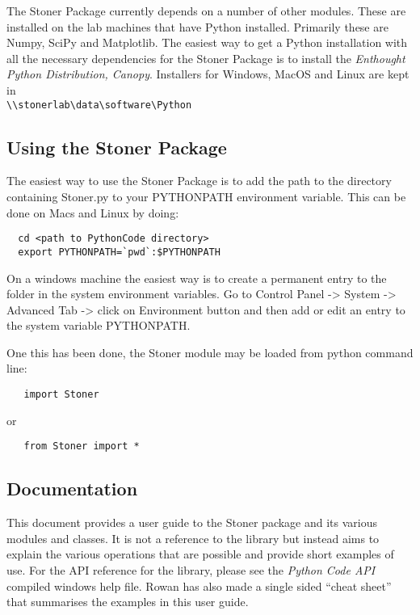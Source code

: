 \documentclass[a4paper,11pt]{scrartcl}
\begin{document}
The Stoner Package currently depends on a number of other modules. These are installed on the lab
machines that have Python installed. Primarily these are Numpy, SciPy and Matplotlib.  The easiest way to get a Python
installation with all the necessary dependencies for the Stoner Package is to install the \textit{Enthought Python Distribution, Canopy}. Installers for Windows, MacOS and Linux are
kept in \\ \verb#\\stonerlab\data\software\Python#


\subsection{Using the Stoner Package}


The easiest way to use the Stoner Package is to add the path to the directory
containing Stoner.py to your PYTHONPATH environment variable. This can be done
on Macs and Linux by doing:
\begin{lstlisting}
  cd <path to PythonCode directory>
  export PYTHONPATH=`pwd`:$PYTHONPATH
\end{lstlisting}
On a windows machine the easiest way is to create a permanent entry to the
folder in the system environment variables. Go to Control Panel -> System ->
Advanced Tab -> click on Environment button and then add or edit an entry to the
system variable PYTHONPATH.

One this has been done, the Stoner module may be loaded from python command
line:

\begin{lstlisting}
   import Stoner
\end{lstlisting}

or

\begin{lstlisting}
   from Stoner import *
\end{lstlisting}

\subsection{Documentation}

This document provides a user guide to the Stoner package and its various modules and classes. It is not a reference to the library but instead aims to explain the various operations that are possible and provide short examples of use. For the API reference for the library, please see the \textit{Python Code API} compiled windows help file. Rowan has also made a single sided ``cheat sheet'' that summarises the examples in this user guide.
\end{document}

